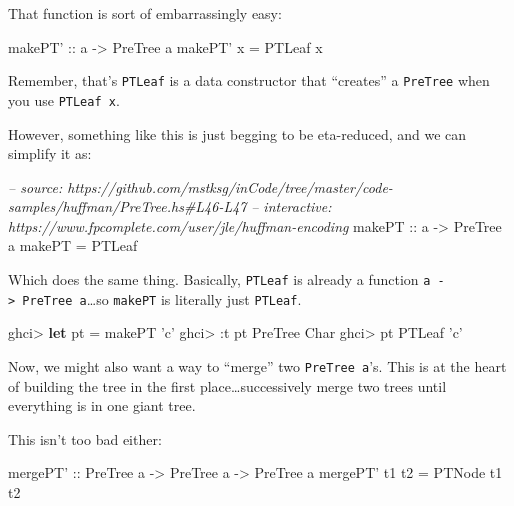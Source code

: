 \documentclass[]{article}
\newenvironment{Shaded}{}{}
\newcommand{\KeywordTok}[1]{\textcolor[rgb]{0.00,0.44,0.13}{\textbf{#1}}}
\newcommand{\DataTypeTok}[1]{\textcolor[rgb]{0.56,0.13,0.00}{#1}}
\newcommand{\CharTok}[1]{\textcolor[rgb]{0.25,0.44,0.63}{#1}}
\newcommand{\CommentTok}[1]{\textcolor[rgb]{0.38,0.63,0.69}{\textit{#1}}}
\newcommand{\OtherTok}[1]{\textcolor[rgb]{0.00,0.44,0.13}{#1}}
\newcommand{\FunctionTok}[1]{\textcolor[rgb]{0.02,0.16,0.49}{#1}}
\newcommand{\NormalTok}[1]{#1}
\begin{document}
That function is sort of embarrassingly easy:

\begin{Shaded}
\begin{Highlighting}[]
\OtherTok{makePT' ::}\NormalTok{ a }\OtherTok{->} \DataTypeTok{PreTree}\NormalTok{ a}
\NormalTok{makePT' x }\FunctionTok{=} \DataTypeTok{PTLeaf}\NormalTok{ x}
\end{Highlighting}
\end{Shaded}

Remember, that's \texttt{PTLeaf} is a data constructor that ``creates'' a
\texttt{PreTree} when you use \texttt{PTLeaf\ x}.

However, something like this is just begging to be eta-reduced, and we can
simplify it as:

\begin{Shaded}
\begin{Highlighting}[]
\CommentTok{-- source: https://github.com/mstksg/inCode/tree/master/code-samples/huffman/PreTree.hs#L46-L47}
\CommentTok{-- interactive: https://www.fpcomplete.com/user/jle/huffman-encoding}
\OtherTok{makePT ::}\NormalTok{ a }\OtherTok{->} \DataTypeTok{PreTree}\NormalTok{ a}
\NormalTok{makePT }\FunctionTok{=} \DataTypeTok{PTLeaf}
\end{Highlighting}
\end{Shaded}

Which does the same thing. Basically, \texttt{PTLeaf} is already a function
\texttt{a\ -\textgreater{}\ PreTree\ a}\ldots{}so \texttt{makePT} is literally
just \texttt{PTLeaf}.

\begin{Shaded}
\begin{Highlighting}[]
\NormalTok{ghci}\FunctionTok{>} \KeywordTok{let}\NormalTok{ pt }\FunctionTok{=}\NormalTok{ makePT }\CharTok{'c'}
\NormalTok{ghci}\FunctionTok{>} \FunctionTok{:}\NormalTok{t pt}
\DataTypeTok{PreTree} \DataTypeTok{Char}
\NormalTok{ghci}\FunctionTok{>}\NormalTok{ pt}
\DataTypeTok{PTLeaf} \CharTok{'c'}
\end{Highlighting}
\end{Shaded}

Now, we might also want a way to ``merge'' two \texttt{PreTree\ a}'s. This is at
the heart of building the tree in the first place\ldots{}successively merge two
trees until everything is in one giant tree.

This isn't too bad either:

\begin{Shaded}
\begin{Highlighting}[]
\OtherTok{mergePT' ::} \DataTypeTok{PreTree}\NormalTok{ a }\OtherTok{->} \DataTypeTok{PreTree}\NormalTok{ a }\OtherTok{->} \DataTypeTok{PreTree}\NormalTok{ a}
\NormalTok{mergePT' t1 t2 }\FunctionTok{=} \DataTypeTok{PTNode}\NormalTok{ t1 t2}
\end{Highlighting}
\end{Shaded}
\end{document}
